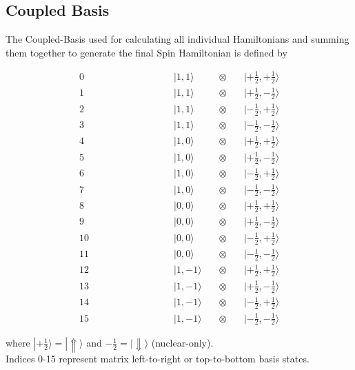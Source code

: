 \documentclass[svgnames]{article}
\begin{document}
\newpage 

\subsection{Coupled Basis}

The Coupled-Basis used for calculating all individual Hamiltonians and summing
them together to generate the final Spin Hamiltonian is defined by 

\[
\begin{alignedat}{2}
 0\qquad\qquad\qquad\qquad & |1,1\rangle   \quad & \otimes \quad & |+\tfrac12,+\tfrac12\rangle\\
 1\qquad\qquad\qquad\qquad & |1,1\rangle   \quad & \otimes \quad & |+\tfrac12,-\tfrac12\rangle\\
 2\qquad\qquad\qquad\qquad & |1,1\rangle   \quad & \otimes \quad & |-\tfrac12,+\tfrac12\rangle\\
 3\qquad\qquad\qquad\qquad & |1,1\rangle   \quad & \otimes \quad & |-\tfrac12,-\tfrac12\rangle\\[4pt]
 4\qquad\qquad\qquad\qquad & |1,0\rangle   \quad & \otimes \quad & |+\tfrac12,+\tfrac12\rangle\\
 5\qquad\qquad\qquad\qquad & |1,0\rangle   \quad & \otimes \quad & |+\tfrac12,-\tfrac12\rangle\\
 6\qquad\qquad\qquad\qquad & |1,0\rangle   \quad & \otimes \quad & |-\tfrac12,+\tfrac12\rangle\\
 7\qquad\qquad\qquad\qquad & |1,0\rangle   \quad & \otimes \quad & |-\tfrac12,-\tfrac12\rangle\\[4pt]
 8\qquad\qquad\qquad\qquad & |0,0\rangle   \quad & \otimes \quad & |+\tfrac12,+\tfrac12\rangle\\
 9\qquad\qquad\qquad\qquad & |0,0\rangle   \quad & \otimes \quad & |+\tfrac12,-\tfrac12\rangle\\
10\qquad\qquad\qquad\qquad & |0,0\rangle   \quad & \otimes \quad & |-\tfrac12,+\tfrac12\rangle\\
11\qquad\qquad\qquad\qquad & |0,0\rangle   \quad & \otimes \quad & |-\tfrac12,-\tfrac12\rangle\\[4pt]
12\qquad\qquad\qquad\qquad & |1,-1\rangle  \quad & \otimes \quad & |+\tfrac12,+\tfrac12\rangle\\
13\qquad\qquad\qquad\qquad & |1,-1\rangle  \quad & \otimes \quad & |+\tfrac12,-\tfrac12\rangle\\
14\qquad\qquad\qquad\qquad & |1,-1\rangle  \quad & \otimes \quad & |-\tfrac12,+\tfrac12\rangle\\
15\qquad\qquad\qquad\qquad & |1,-1\rangle  \quad & \otimes \quad & |-\tfrac12,-\tfrac12\rangle
\end{alignedat}
\]

where $|+\frac{1}{2}\rangle = |\Uparrow\rangle$ and $-\frac{1}{2} =
|\Downarrow\rangle$ (nuclear-only).\\

\vspace{5px} 
Indices 0-15 represent matrix left-to-right or top-to-bottom basis states. 
\end{document}
